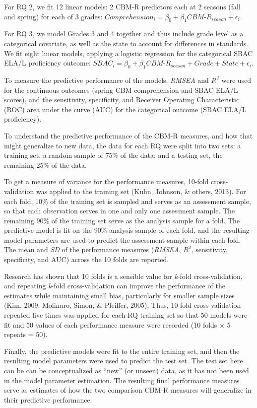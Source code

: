 \documentclass[
  english,
  man, fleqn, noextraspace]{apa6}
\begin{document}
For RQ 2, we fit 12 linear models: 2 CBM-R predictors each at 2 seasons (fall and spring) for each of 3 grades: \(Comprehension_i = \beta_0 + \beta_1CBM\mbox{-}R_{season} + \epsilon_i\).

For RQ 3, we model Grades 3 and 4 together and thus include grade level as a categorical covariate, as well as the state to account for differences in standards. We fit eight linear models, applying a logistic regression for the categorical SBAC ELA/L proficiency outcome: \(SBAC_i = \beta_0 + \beta_1CBM\mbox{-}R_{season} + Grade + State + \epsilon_i\).

To measure the predictive performance of the models, \emph{RMSEA} and \(R^2\) were used for the continuous outcomes (spring CBM comprehension and SBAC ELA/L scores), and the sensitivity, specificity, and Receiver Operating Characteristic (ROC) area under the curve (AUC) for the categorical outcome (SBAC ELA/L proficiency).

To understand the predictive performance of the CBM-R measures, and how that might generalize to new data, the data for each RQ were split into two sets: a training set, a random sample of 75\% of the data; and a testing set, the remaining 25\% of the data.

To get a measure of variance for the performance measures, 10-fold cross-validation was applied to the training set (Kuhn, Johnson, \& others, 2013). For each fold, 10\% of the training set is sampled and serves as an assessment sample, so that each observation serves in one and only one assessment sample. The remaining 90\% of the training set serve as the analysis sample for a fold. The predictive model is fit on the 90\% analysis sample of each fold, and the resulting model parameters are used to predict the assessment sample within each fold. The mean and \emph{SD} of the performance measures (\emph{RMSEA}, \(R^2\), sensitivity, specificity, and AUC) across the 10 folds are reported.

Research has shown that 10 folds is a sensible value for \emph{k}-fold cross-validation, and repeating \emph{k}-fold cross-validation can improve the performance of the estimates while maintaining small bias, particularly for smaller sample sizes (Kim, 2009; Molinaro, Simon, \& Pfeiffer, 2005). Thus, 10-fold cross-validation repeated five times was applied for each RQ training set so that 50 models were fit and 50 values of each performance measure were recorded (10 folds \(\times\) 5 repeats = 50).

Finally, the predictive models were fit to the entire training set, and then the resulting model parameters were used to predict the test set. The test set here can be can be conceptualized as \enquote{new} (or unseen) data, as it has not been used in the model parameter estimation. The resulting final performance measures serve as estimates of how the two comparison CBM-R measures will generalize in their predictive performance.
\end{document}
